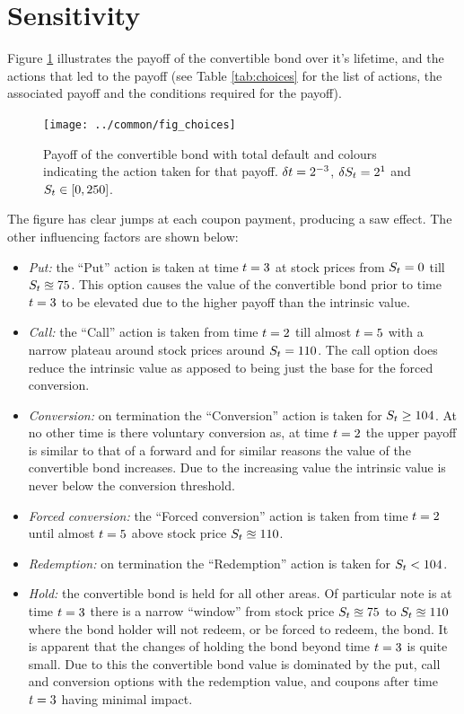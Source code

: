 \documentclass[a4paper,11pt,oneside]{report}
\theoremstyle{plain}
\theoremstyle{definition}
\begin{document}

\section{Sensitivity}
Figure \ref{fig:choices} illustrates the payoff of the convertible bond over it's lifetime, and the actions that led to the payoff (see Table \ref{tab:choices} for the list of actions, the associated payoff and the conditions required for the payoff).

\begin{figure}[htb!]
 \centering
 \texttt{[image: ../common/fig\_choices]}
 \caption[Payoff]{Payoff of the convertible bond with total default and colours indicating the action taken for that payoff.  $\Dt = 2^{-3}$, $\DS = 2^{1}$ and $\S \in [0, 250]$.}
 \label{fig:choices}
\end{figure}

The figure has clear jumps at each coupon payment, producing a saw effect.  The other influencing factors are shown below:
\begin{itemize}
 \item \emph{Put:} the ``Put'' action is taken at time $\t = 3$ at stock prices from $\S = 0$ till $\S \approxeq 75$.  This option causes the value of the convertible bond prior to time $\t = 3$ to be elevated due to the higher payoff than the intrinsic value.
 \item \emph{Call:} the ``Call'' action is taken from time $\t = 2$ till almost $\t = 5$ with a narrow plateau around stock prices around $\S = 110$.  The call option does reduce the intrinsic value as apposed to being just the base for the forced conversion.
 \item \emph{Conversion:} on termination the ``Conversion'' action is taken for $\S \ge 104$.  At no other time is there voluntary conversion as, at time $\t = 2$ the upper payoff is similar to that of a forward and for similar reasons the value of the convertible bond increases.  Due to the increasing value the intrinsic value is never below the conversion threshold.
 \item \emph{Forced conversion:} the ``Forced conversion'' action is taken from time $\t = 2$ until almost $\t = 5$ above stock price $\S \approxeq 110$.
 \item \emph{Redemption:} on termination the ``Redemption'' action is taken for $\S < 104$.
 \item \emph{Hold:} the convertible bond is held for all other areas.  Of particular note is at time $\t = 3$ there is a narrow ``window'' from stock price $\S \approxeq 75$ to $\S \approxeq 110$ where the bond holder will not redeem, or be forced to redeem, the bond.  It is apparent that the changes of holding the bond beyond time $\t = 3$ is quite small.  Due to this the convertible bond value is dominated by the put, call and conversion options with the redemption value, and coupons after time $\t = 3$ having minimal impact.
\end{itemize}
\end{document}
